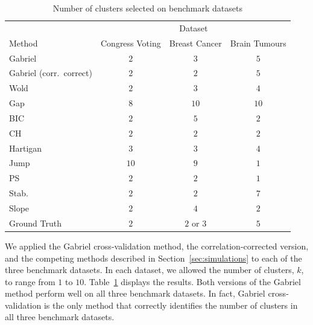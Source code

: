 \documentclass[12pt]{article}
\begin{document}
\begin{table}
\centering
\captionsetup{justification=centering}
\caption{\label{tab:benchmark} Number of clusters selected on benchmark datasets}
\begin{tabular}{lccc}
\toprule                  
         & \multicolumn{3}{c}{Dataset} \\
\cmidrule(l){2-4}
Method   & Congress Voting & Breast Cancer & Brain Tumours \\
\midrule                    
Gabriel  & $2$             & $3$           & $5$  \\    
Gabriel (corr.~correct) & $2$ & $2$           & $5$  \\  
Wold     & $2$             & $3$           & $4$  \\
Gap      & $8$             & $10$          & $10$ \\   
BIC      & $2$         & $5$           & $2$  \\   
CH       & $2$             & $2$           & $2$  \\
Hartigan & $3$             & $3$           & $4$  \\
Jump     & $10$            & $9$           & $1$  \\   
PS       & $2$  & $2$           & $1$  \\
Stab.    & $2$  & $2$           & $7$  \\ 
Slope	 & $2$  & $4$           & $2$ \\
\midrule 
Ground Truth & $2$         & $2$ or $3$    & $5$  \\
\bottomrule
\end{tabular}
\end{table} 




We applied the Gabriel cross-validation method, the correlation-corrected
version, and the competing methods described in Section~\ref{sec:simulations}
to each of the three benchmark datasets.  In each dataset, we allowed the
number of clusters, $k$, to range from $1$ to $10$.  Table~\ref{tab:benchmark}
displays the results.  Both versions of the Gabriel method perform well on all
three benchmark datasets. In fact, Gabriel cross-validation is the only method
that correctly identifies the number of clusters in all three benchmark
datasets.
\end{document}
